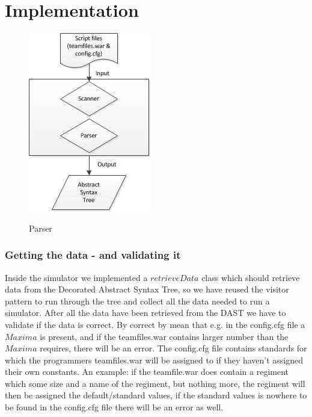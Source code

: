 \section{Implementation}



\begin{figure}[H]
\centering
\includegraphics[scale=1]{rapport/6/figures/parser}
\label{fig:parser}
\caption{Parser}
\end{figure}


\subsubsection{Getting the data - and validating it}
Inside the simulator we implemented a $retrieveData$ class which should retrieve data from the Decorated Abstract Syntax Tree, so we have reused the visitor pattern to run through the tree and collect all the data needed to run a simulator. After all the data have been retrieved from the DAST we have to validate if the data is correct. By correct by mean that e.g. in the config.cfg file a $Maxima$ is present, and if the teamfiles.war contains larger number than the $Maxima$ requires, there will be an error. The config.cfg file contains standards for which the programmers teamfiles.war will be assigned to if they haven't assigned their own constants. An example: if the teamfile.war does contain a regiment which some size and a name of the regiment, but nothing more, the regiment will then be assigned the default/standard values, if the standard values is nowhere to be found in the config.cfg file there will be an error as well.

